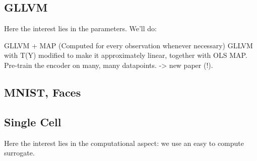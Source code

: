 \documentclass[twoside,11pt]{article}
\begin{document}
\subsection{GLLVM}
Here the interest lies in the parameters. We'll do:

GLLVM + MAP (Computed for every observation whenever necessary)
GLLVM with T(Y) modified to make it approximately linear, together with OLS MAP.
Pre-train the encoder on many, many datapoints. -> new paper (!). 

\subsection{MNIST, Faces}

\subsection{Single Cell}
Here the interest lies in the computational aspect: we use an easy to compute surrogate.

\appendix


\end{document}
